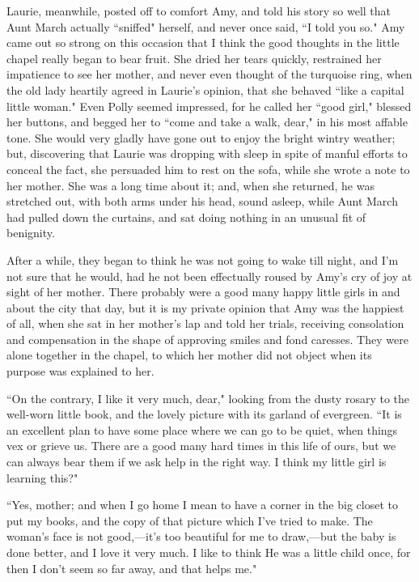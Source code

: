 Laurie, meanwhile, posted off to comfort Amy, and told his story so well
that Aunt March actually ``sniffed" herself, and never once said, ``I told
you so." Amy came out so strong on this occasion that I think the good
thoughts in the little chapel really began to bear fruit. She dried her
tears quickly, restrained her impatience to see her mother, and never
even thought of the turquoise ring, when the old lady heartily agreed in
Laurie's opinion, that she behaved ``like a capital
little woman." Even Polly seemed impressed, for he called her ``good
girl," blessed her buttons, and begged her to ``come and take a walk,
dear," in his most affable tone. She would very gladly have gone out to
enjoy the bright wintry weather; but, discovering that Laurie was
dropping with sleep in spite of manful efforts to conceal the fact, she
persuaded him to rest on the sofa, while she wrote a note to her mother.
She was a long time about it; and, when she returned, he was stretched
out, with both arms under his head, sound asleep, while Aunt March had
pulled down the curtains, and sat doing nothing in an unusual fit of
benignity.

After a while, they began to think he was not going to wake till night,
and I'm not sure that he would, had he not been
effectually roused by Amy's cry of joy at sight of her
mother. There probably were a good many happy little girls in and about
the city that day, but it is my private opinion that Amy was the
happiest of all, when she sat in her mother's lap and
told her trials, receiving consolation and compensation in the shape of
approving smiles and fond caresses. They were alone together in the
chapel, to which her mother did not object when its purpose was
explained to her.

``On the contrary, I like it very much, dear," looking from the dusty
rosary to the well-worn little book, and the lovely picture with its
garland of evergreen. ``It is an excellent plan to have some place where
we can go to be quiet, when things vex or grieve us. There are a good
many hard times in this life of ours, but we can always bear them if we
ask help in the right way. I think my little girl is learning this?"

``Yes, mother; and when I go home I mean to have a corner in the big
closet to put my books, and the copy of that picture which
I've tried to make. The woman's face is
not good,---it's too beautiful for me to draw,---but the
baby is done better, and I love it very much. I like to think He was a
little child once, for then I don't seem so far away,
and that helps me."

